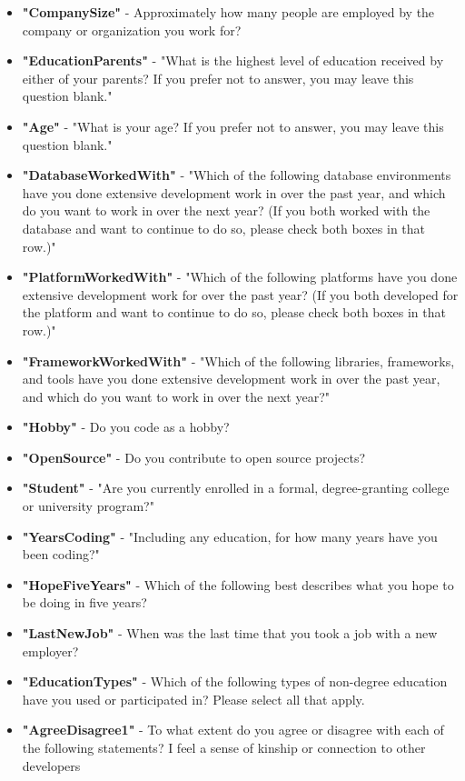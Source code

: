 \begin{appendices}
\begin{itemize}
        \item \textbf{"CompanySize"} - Approximately how many people are employed by the company or organization you work for?
        \item \textbf{"EducationParents"} - "What is the highest level of education received by either of your parents? If you prefer not to answer, you may leave this question blank."
        \item \textbf{"Age"} - "What is your age? If you prefer not to answer, you may leave this question blank."
        \item \textbf{"DatabaseWorkedWith"} - "Which of the following database environments have you done extensive development work in over the past year, and which do you want to work in over the next year?   (If you both worked with the database and want to continue to do so, please check both boxes in that row.)"
        \item \textbf{"PlatformWorkedWith"} - "Which of the following platforms have you done extensive development work for over the past year?   (If you both developed for the platform and want to continue to do so, please check both boxes in that row.)"
        \item \textbf{"FrameworkWorkedWith"} - "Which of the following libraries, frameworks, and tools have you done extensive development work in over the past year, and which do you want to work in over the next year?"
        \item \textbf{"Hobby"} - Do you code as a hobby?
        \item \textbf{"OpenSource"} - Do you contribute to open source projects?
        \item \textbf{"Student"} - "Are you currently enrolled in a formal, degree-granting college or university program?"
        \item \textbf{"YearsCoding"} - "Including any education, for how many years have you been coding?"
        \item \textbf{"HopeFiveYears"} - Which of the following best describes what you hope to be doing in five years?
        \item \textbf{"LastNewJob"} - When was the last time that you took a job with a new employer?
        \item \textbf{"EducationTypes"} - Which of the following types of non-degree education have you used or participated in? Please select all that apply.
        \item \textbf{"AgreeDisagree1"} - To what extent do you agree or disagree with each of the following statements? I feel a sense of kinship or connection to other developers

\end{itemize}
\end{appendices}
